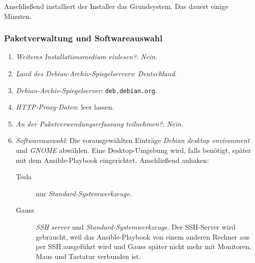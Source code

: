 Anschließend installiert der Installer das Grundsystem. Das dauert einige Minuten.

\subsubsection{Paketverwaltung und Softwareauswahl}
\label{grundsystem-installieren-software}
\begin{enumerate}
	\item \textit{Weiteres Installationsmedium einlesen?}: \textit{Nein}.
	\item \textit{Land des Debian-Archiv-Spiegelservers}: \textit{Deutschland}.
	\item \textit{Debian-Archiv-Spiegelserver}: \texttt{deb.debian.org}.
	\item \textit{HTTP-Proxy-Daten}: leer lassen.
	\item \textit{An der Paketverwendungserfassung teilnehmen?}: \textit{Nein}.
	\item \textit{Softwareauswahl}: Die vorausgewählten Einträge \textit{Debian desktop environment} und \textit{GNOME} abwählen. Eine Desktop-Umgebung wird, falls benötigt, später mit dem Ansible-Playbook eingerichtet. Anschließend anhaken:
	      \begin{description}
		      \item[Tesla] nur \textit{Standard-Systemwerkzeuge}.
		      \item[Gauss] \textit{SSH server} und \textit{Standard-Systemwerkzeuge}. Der SSH-Server wird gebraucht, weil das Ansible-Playbook von einem anderen Rechner aus per SSH ausgeführt wird und Gauss später nicht mehr mit Monitoren, Maus und Tastatur verbunden ist.
	      \end{description}
\end{enumerate}

